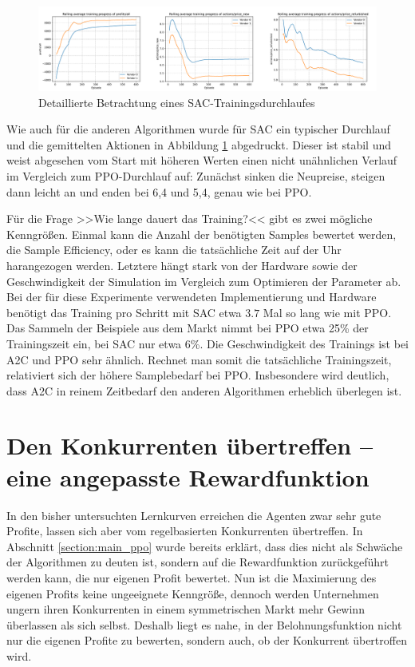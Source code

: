 \begin{figure}[htbp]
	\centering
	\includegraphics[width=\textwidth]{main/sac_detailed_analysis.pdf}
	\caption{Detaillierte Betrachtung eines SAC-Trainingsdurchlaufes}
	\label{graphic:SACDetails}
\end{figure}

Wie auch für die anderen Algorithmen wurde für SAC ein typischer Durchlauf und die gemittelten Aktionen in Abbildung \ref{graphic:SACDetails} abgedruckt.
Dieser ist stabil und weist abgesehen vom Start mit höheren Werten einen nicht unähnlichen Verlauf im Vergleich zum PPO-Durchlauf auf:
Zunächst sinken die Neupreise, steigen dann leicht an und enden bei 6,4 und 5,4, genau wie bei PPO.

Für die Frage >>Wie lange dauert das Training?<< gibt es zwei mögliche Kenngrößen.
Einmal kann die Anzahl der benötigten Samples bewertet werden, die Sample Efficiency, oder es kann die tatsächliche Zeit auf der Uhr harangezogen werden.
Letztere hängt stark von der Hardware sowie der Geschwindigkeit der Simulation im Vergleich zum Optimieren der Parameter ab.
Bei der für diese Experimente verwendeten Implementierung und Hardware benötigt das Training pro Schritt mit SAC etwa $3.7$ Mal so lang wie mit PPO.
Das Sammeln der Beispiele aus dem Markt nimmt bei PPO etwa 25\% der Trainingszeit ein, bei SAC nur etwa 6\%.
Die Geschwindigkeit des Trainings ist bei A2C und PPO sehr ähnlich.
Rechnet man somit die tatsächliche Trainingszeit, relativiert sich der höhere Samplebedarf bei PPO.
Insbesondere wird deutlich, dass A2C in reinem Zeitbedarf den anderen Algorithmen erheblich überlegen ist.

\section{Den Konkurrenten übertreffen -- eine angepasste Rewardfunktion}
\label{section:mixed_reward_function}
In den bisher untersuchten Lernkurven erreichen die Agenten zwar sehr gute Profite, lassen sich aber vom regelbasierten Konkurrenten übertreffen.
In Abschnitt \ref{section:main_ppo} wurde bereits erklärt, dass dies nicht als Schwäche der Algorithmen zu deuten ist, sondern auf die Rewardfunktion zurückgeführt werden kann, die nur eigenen Profit bewertet.
Nun ist die Maximierung des eigenen Profits keine ungeeignete Kenngröße, dennoch werden Unternehmen ungern ihren Konkurrenten in einem symmetrischen Markt mehr Gewinn überlassen als sich selbst.
Deshalb liegt es nahe, in der Belohnungsfunktion nicht nur die eigenen Profite zu bewerten, sondern auch, ob der Konkurrent übertroffen wird.


